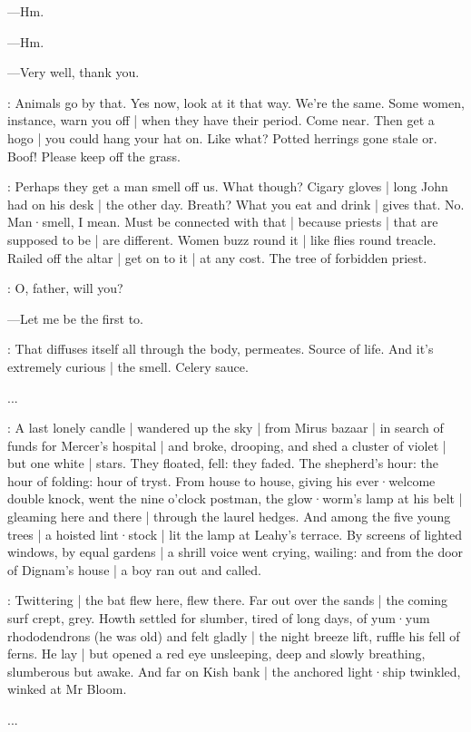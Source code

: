 ---Hm.

---Hm.

---Very well,
thank you.

\BloomAbstract:
Animals go by that.%
Yes now,
look at it that way.
We're the same.
Some women,
instance,
warn you off |
when they have their period.
Come near.
Then get a hogo |
you could hang your hat on.
Like what?
Potted herrings gone stale or.
Boof!
Please keep off the grass.

\BloomAbstract:
Perhaps they get a man smell off us.
What though?
Cigary gloves |
long John had on his desk |
the other day.
Breath?
What you eat and drink |
gives that.
No.
Man·smell,
I mean.
Must be connected with that |
because priests |
that are supposed to be |
are different.
Women buzz round it |
like flies round treacle.
Railed off the altar |
get on to it |
at any cost.
The tree of forbidden priest.

\BloomOther:
O,
father,
will you?

---Let me be the first to.

\BloomAbstract:
That diffuses itself all through the body,
permeates.%
Source of life.
And it's extremely curious |
the smell.
Celery sauce.

...

\Nnovel:
A last lonely candle |
wandered up the sky |
from Mirus bazaar |
in search of funds for Mercer's hospital |
and broke,
drooping,
and shed a cluster of violet |
but one white |
stars.
They floated,
fell:
they faded.
The shepherd's hour:
the hour of folding:
hour of tryst.
From house to house,
giving his ever·welcome double knock,%
went the nine o'clock postman,
the glow·worm's lamp at his belt |
gleaming here and there |
through the laurel hedges.
And among the five young trees |
a hoisted lint·stock |
lit the lamp at Leahy's terrace.
By screens of lighted windows,
by equal gardens |
a shrill voice went crying,
wailing:
and from the door of Dignam's house |
a boy ran out and called.

:
Twittering |
the bat flew here,
flew there.
Far out over the sands |
the coming surf crept,
grey.
Howth settled for slumber,
tired of long days,
of yum·yum rhododendrons
(he was old)
and felt gladly |
the night breeze lift,
ruffle his fell of ferns.
He lay |
but opened a red eye
unsleeping,
deep and slowly breathing,
slumberous but awake.%
And far on Kish bank |
the anchored light·ship twinkled,
winked at Mr Bloom.

...
